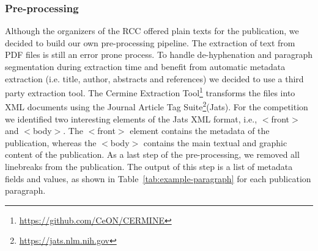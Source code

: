 

\subsubsection{Pre-processing}
\label{sec:prepro}
Although the organizers of the RCC offered plain texts for the publication, we decided to build our own pre-processing pipeline.
The extraction of text from PDF files is still an error prone process. To handle de-hyphenation and paragraph segmentation during extraction time and benefit from automatic metadata extraction (i.e. title, author, abstracts and references) we decided to use a third party extraction tool.
The Cermine Extraction Tool\footnote{\url{https://github.com/CeON/CERMINE}}\cite{tkaczyk2015cermine} transforms the files into XML documents using the Journal Article Tag Suite\footnote{\url{https://jats.nlm.nih.gov}}(Jats).
For the competition we identified two interesting elements of the Jats XML format, i.e., $<$front$>$ and $<$body$>$. The $<$front$>$ element contains the metadata of the publication, whereas the $<$body$>$ contains the main textual and graphic content of the publication.
As a last step of the pre-processing, we removed all linebreaks from the publication.
The output of this step is a list of metadata fields and values, as shown in Table~\ref{tab:example-paragraph} for each publication paragraph.

